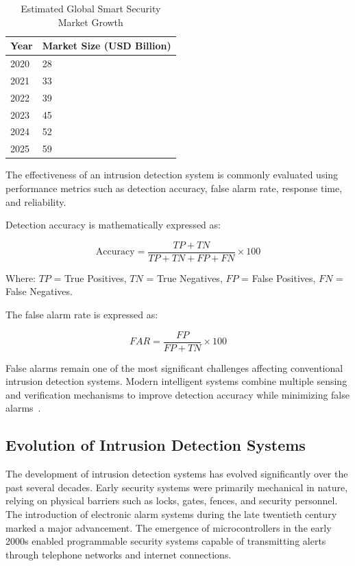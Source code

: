 \documentclass[12pt,a4paper,oneside]{report}
\begin{document}
\begin{table}[htbp]
  \centering
  \caption{Estimated Global Smart Security Market Growth}
  {\small
  \begin{tabular}{|p{4.00cm}|p{6.00cm}|}
    \hline
    \textbf{Year} & \textbf{Market Size (USD Billion)} \\
    \hline
    2020 & 28 \\
    2021 & 33 \\
    2022 & 39 \\
    2023 & 45 \\
    2024 & 52 \\
    2025 & 59 \\
    \hline
  \end{tabular}
  }
\end{table}

The effectiveness of an intrusion detection system is commonly evaluated using performance metrics such as detection accuracy, false alarm rate, response time, and reliability.

Detection accuracy is mathematically expressed as:

\begin{equation}
  \text{Accuracy} = \frac{TP + TN}{TP + TN + FP + FN} \times 100
\end{equation}

Where: $TP$ = True Positives, $TN$ = True Negatives, $FP$ = False Positives, $FN$ = False Negatives.

The false alarm rate is expressed as:

\begin{equation}
  FAR = \frac{FP}{FP + TN} \times 100
\end{equation}

False alarms remain one of the most significant challenges affecting conventional intrusion detection systems. Modern intelligent systems combine multiple sensing and verification mechanisms to improve detection accuracy while minimizing false alarms~\cite{ref6,ref7}.

\subsection{Evolution of Intrusion Detection Systems}

The development of intrusion detection systems has evolved significantly over the past several decades. Early security systems were primarily mechanical in nature, relying on physical barriers such as locks, gates, fences, and security personnel. The introduction of electronic alarm systems during the late twentieth century marked a major advancement. The emergence of microcontrollers in the early 2000s enabled programmable security systems capable of transmitting alerts through telephone networks and internet connections.
\end{document}
